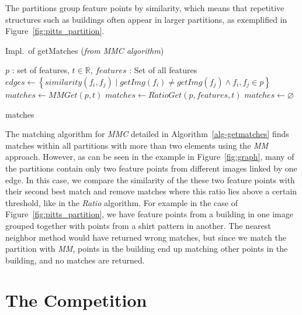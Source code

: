 The partitions group feature points by similarity, which means that 
repetitive structures such as buildings often appear in larger 
partitions, as exemplified in Figure~\ref{fig:pitts_partition}.

\begin{algorithm}[htb]
\caption{Impl.\ of getMatches (\emph{from MMC algorithm})}
\label{alg-getmatches}
    \fontsize{10}{10}\selectfont
    \begin{algorithmic}
    \Require $p$ : set of features, $t\in \mathbb{R}$, $features$ : Set of 
    all features
    \State $edges \gets \left\{similarity(f_i, f_j) \mid getImg(f_i)
        \neq getImg(f_j) \wedge f_i, f_j \in p \right\}$
        \State $matches \gets MMGet(p, t)$
        \State $matches \gets RatioGet(p, features, t)$
    \Else
        \State $matches \gets \varnothing$
    \EndIf

    \Return matches
    \end{algorithmic}
\end{algorithm}

The matching algorithm for \emph{MMC} detailed in 
Algorithm~\ref{alg-getmatches} finds matches within all partitions with 
more than two elements using the \emph{MM} approach.  However, as can be 
seen in the example in Figure~\ref{fig:graph}, many of the partitions 
contain only two feature points from different images linked by one 
edge. In this case, we compare the similarity of the these two feature 
points with their second best match and remove matches where this ratio 
lies above a certain threshold, like in the \emph{Ratio} algorithm.  For 
example in the case of Figure~\ref{fig:pitts_partition}, we have feature 
points from a building in one image grouped together with points from a 
shirt pattern in another.  The nearest neighbor method would have 
returned wrong matches, but since we match the partition with \emph{MM}, 
points in the building end up matching other points in the building, and 
no matches are returned.

\section{The Competition}

